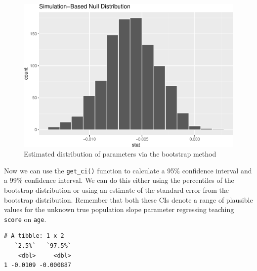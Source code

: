 \documentclass[]{article}
\newenvironment{Shaded}{\begin{snugshade}}{\end{snugshade}}
\newcommand{\KeywordTok}[1]{\textcolor[rgb]{0.13,0.29,0.53}{\textbf{#1}}}
\newcommand{\DataTypeTok}[1]{\textcolor[rgb]{0.13,0.29,0.53}{#1}}
\newcommand{\DecValTok}[1]{\textcolor[rgb]{0.00,0.00,0.81}{#1}}
\newcommand{\FloatTok}[1]{\textcolor[rgb]{0.00,0.00,0.81}{#1}}
\newcommand{\StringTok}[1]{\textcolor[rgb]{0.31,0.60,0.02}{#1}}
\newcommand{\OperatorTok}[1]{\textcolor[rgb]{0.81,0.36,0.00}{\textbf{#1}}}
\newcommand{\NormalTok}[1]{#1}
\begin{document}
\begin{figure}
\centering
\includegraphics{DAWeek8_files/figure-latex/sampling1-1.pdf}
\caption{\label{fig.sampling1}Estimated distribution of parameters via
the bootstrap method}
\end{figure}

Now we can use the \texttt{get\_ci()} function to calculate a 95\%
confidence interval and a 99\% confidence interval. We can do this
either using the percentiles of the bootstrap distribution or using an
estimate of the standard error from the bootstrap distribution. Remember
that both these CIs denote a range of plausible values for the unknown
true population slope parameter regressing teaching \texttt{score} on
\texttt{age}.

\begin{Shaded}
\end{Shaded}

\begin{verbatim}
# A tibble: 1 x 2
   `2.5%`   `97.5%`
    <dbl>     <dbl>
1 -0.0109 -0.000887
\end{verbatim}

\begin{Shaded}
\end{Shaded}
\end{document}
